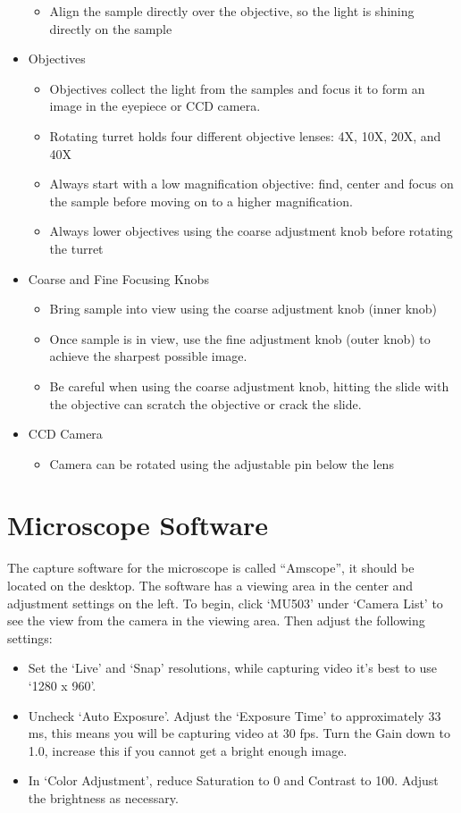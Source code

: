 \begin{itemize}
\begin{itemize}
	\item Align the sample directly over the objective, so the light is shining directly on the sample
\end{itemize}
\item Objectives
\begin{itemize}
	\setlength\itemsep{1pt}
	\item Objectives collect the light from the samples and focus it to form an image in the eyepiece or CCD camera.
	\item Rotating turret holds four different objective lenses: 4X, 10X, 20X, and 40X
	\item Always start with a low magnification objective: find, center and focus on the sample before moving on to a higher magnification.
	\item Always lower objectives using the coarse adjustment knob before rotating the turret
\end{itemize}
\item Coarse and Fine Focusing Knobs
\begin{itemize}
	\setlength\itemsep{1pt}
	\item Bring sample into view using the coarse adjustment knob (inner knob)
	\item Once sample is in view, use the fine adjustment knob (outer knob) to achieve the sharpest possible image.
	\item Be careful when using the coarse adjustment knob, hitting the slide with the objective can scratch the objective or crack the slide.
\end{itemize}
\item CCD Camera
\begin{itemize}
	\setlength\itemsep{1pt}	
	\item Camera can be rotated using the adjustable pin below the lens
\end{itemize}
\end{itemize}

\section*{Microscope Software}
The capture software for the microscope is called ``Amscope'', it should be located on the desktop.
The software has a viewing area in the center and adjustment settings on the left.
To begin, click `MU503' under `Camera List' to see the view from the camera in the viewing area.
Then adjust the following settings:
\begin{itemize}
\item Set the `Live' and `Snap' resolutions, while capturing video it's best to use `1280 x 960'.
\item Uncheck `Auto Exposure'. Adjust the `Exposure Time' to approximately 33 ms, this means you will be capturing video at 30 fps. Turn the Gain down to 1.0, increase this if you cannot get a bright enough image.
\item In `Color Adjustment', reduce Saturation to 0 and Contrast to 100. Adjust the brightness as necessary.
\end{itemize}
